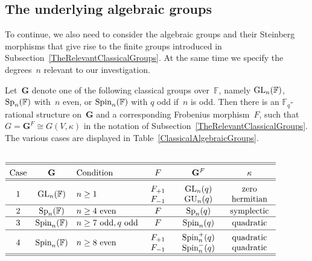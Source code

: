 \documentclass[12pt]{amsart}
\newcommand{\bG}{{\mathbf{G}}}      %
\def\GL{ \text{\rm GL} }
\def\GU{ \text{\rm GU} }
\def\Sp{ \text{\rm Sp} }
\def\Spin{ \text{\rm Spin} }
\theoremstyle{theorem}
\theoremstyle{definition}
\theoremstyle{remark}
\begin{document}
\subsection{The underlying algebraic groups}
\label{UnderlyingAlgebraicGroups}

To continue, we also need to consider the algebraic groups and their Steinberg 
morphisms that give rise to the finite groups introduced in 
Subsection~\ref{TheRelevantClassicalGroups}. At the same time we specify the
degrees~$n$ relevant to our investigation.

Let~$\bG$ denote one of the following classical groups over~$\mathbb{F}$, namely
$\GL_n( \mathbb{F} )$, $\Sp_n( \mathbb{F} )$ with~$n$ even, or 
$\Spin_n( \mathbb{F} )$ with $q$ odd if~$n$ is odd. Then there is an 
$\mathbb{F}_q$-rational structure on~$\bG$ and a corresponding Frobenius 
morphism~$F$, such that $G = \bG^F \cong G(V, \kappa)$ in the notation 
of Subsection~\ref{TheRelevantClassicalGroups}. The various cases are displayed
in Table~\ref{ClassicalAlgebraicGroups}.
\begin{table}
\caption{\label{ClassicalAlgebraicGroups} Some classical algebraic groups}
$
\begin{array}{cclccc}\\ \hline\hline
\text{\rm Case} & \bG & \text{\rm Condition} & F & \bG^F & \kappa \rule[- 3pt]{0pt}{ 16pt} \\ \hline\hline
1 & \GL_n( \mathbb{F} ) & n \geq 1 & \begin{array}{c} F_{+1} \\ F_{-1} \end{array} & 
\begin{array}{c} \GL_n( q ) \\ \GU_n( q ) \end{array} &
\begin{array}{c} \text{\rm zero} \\ \text{\rm hermitian} \end{array} \rule[ 0pt]{0pt}{ 19pt} \\ \hline
2 & \Sp_n( \mathbb{F} ) & n \geq 4 \text{\rm\ even} & F & \Sp_n( q ) & 
\text{\rm symplectic} \rule[-3pt]{0pt}{ 13pt} \\ \hline
3 & \Spin_n( \mathbb{F} ) & n \geq 7 \text{\rm\ odd}, q \text{\rm\ odd} & 
F & \Spin_n( q ) & \text{\rm quadratic} \rule[-5pt]{0pt}{ 15pt} \\ \hline
4 & \Spin_n( \mathbb{F} ) & n \geq 8 \text{\rm\ even} & \begin{array}{c} F_{+1} \\ F_{-1} \end{array} & 
\begin{array}{c} \Spin^+_n( q ) \\ \Spin^-_n( q ) \end{array} &
\begin{array}{c} \text{\rm quadratic} \\ \text{\rm quadratic} \end{array} \rule[- 2pt]{0pt}{20pt} \\ \hline\hline
\end{array}
$
\end{table}
\end{document}
